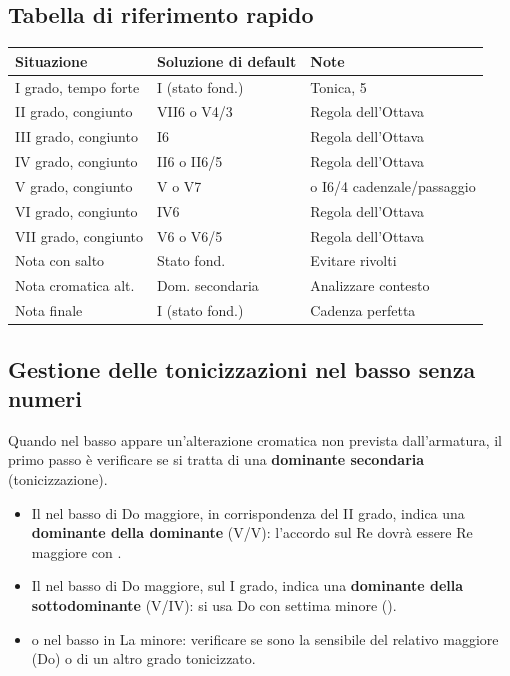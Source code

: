 \subsection{Tabella di riferimento rapido}

\begin{center}
\begin{tabular}{|l|l|l|}
\hline
\textbf{Situazione} & \textbf{Soluzione di default} & \textbf{Note} \\
\hline
I grado, tempo forte & I (stato fond.) & Tonica, 5 \\
II grado, congiunto & VII6 o V4/3 & Regola dell'Ottava \\
III grado, congiunto & I6 & Regola dell'Ottava \\
IV grado, congiunto & II6 o II6/5 & Regola dell'Ottava \\
V grado, congiunto & V o V7 & o I6/4 cadenzale/passaggio \\
VI grado, congiunto & IV6 & Regola dell'Ottava \\
VII grado, congiunto & V6 o V6/5 & Regola dell'Ottava \\
Nota con salto & Stato fond. & Evitare rivolti \\
Nota cromatica alt. & Dom. secondaria & Analizzare contesto \\
Nota finale & I (stato fond.) & Cadenza perfetta \\
\hline
\end{tabular}
\end{center}

\subsection{Gestione delle tonicizzazioni nel basso senza numeri}

Quando nel basso appare un'alterazione cromatica non prevista dall'armatura, il primo passo è verificare se si tratta di una \textbf{dominante secondaria} (tonicizzazione).

\begin{regola}
	\label{reg:dom_secondaria_basso}
	\begin{itemize}
		\item Il \Fadiesis{} nel basso di Do maggiore, in corrispondenza del II grado, indica una \textbf{dominante della dominante} (V/V): l'accordo sul Re dovrà essere Re maggiore con \Fadiesis{}.
		\item Il \Sibemolle{} nel basso di Do maggiore, sul I grado, indica una \textbf{dominante della sottodominante} (V/IV): si usa Do con settima minore (\Sibemolle{}).
		\item \Midiesis{} o \Ladiesis{} nel basso in La minore: verificare se sono la sensibile del relativo maggiore (Do) o di un altro grado tonicizzato.
	\end{itemize}
\end{regola}

